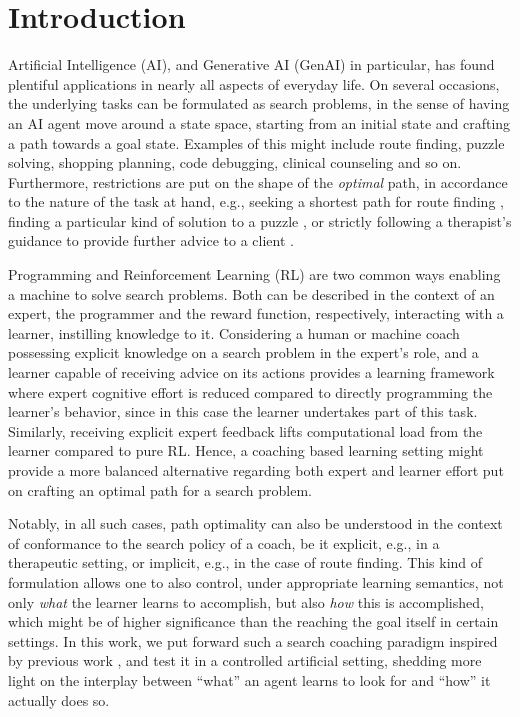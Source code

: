 \documentclass[a4paper,twoside]{article}
\begin{document}
\section{Introduction}\label{sec:introduction}
%
Artificial Intelligence (AI), and Generative AI (GenAI) in particular, has found plentiful applications in nearly all aspects of everyday life. On several occasions, the underlying tasks can be formulated as search problems, in the sense of having an AI agent move around a state space, starting from an initial state and crafting a path towards a goal state. Examples of this might include route finding, puzzle solving, shopping planning, code debugging, clinical counseling and so on. Furthermore, restrictions are put on the shape of the \emph{optimal} path, in accordance to the nature of the task at hand, e.g., seeking a shortest path for route finding \cite{liu1996intelligent,migel2024optimal}, finding a particular kind of solution to a puzzle \cite{mutalova2023}, or strictly following a therapist's guidance to provide further advice to a client \cite{sedlakova2023,fiske2019}.

Programming and Reinforcement Learning (RL) are two common ways enabling a machine to solve search problems. Both can be described in the context of an expert, the programmer and the reward function, respectively, interacting with a learner, instilling knowledge to it. Considering a human or machine coach possessing explicit knowledge on a search problem in the expert's role, and a learner capable of receiving advice on its actions provides a learning framework where expert cognitive effort is reduced compared to directly programming the learner's behavior, since in this case the learner undertakes part of this task. Similarly, receiving explicit expert feedback lifts computational load from the learner compared to pure RL. Hence, a coaching based learning setting might provide a more balanced alternative regarding both expert and learner effort put on crafting an optimal path for a search problem.

Notably, in all such cases, path optimality can also be understood in the context of conformance to the search policy of a coach, be it explicit, e.g., in a therapeutic setting, or implicit, e.g., in the case of route finding. This kind of formulation allows one to also control, under appropriate learning semantics, not only \emph{what} the learner learns to accomplish, but also \emph{how} this is accomplished, which might be of higher significance than the reaching the goal itself in certain settings. In this work, we put forward such a search coaching paradigm inspired by previous work \cite{michaelMachineCoaching2019,prudens2022}, and test it in a controlled artificial setting, shedding more light on the interplay between ``what'' an agent learns to look for and ``how'' it actually does so.
%
%
%
\end{document}
